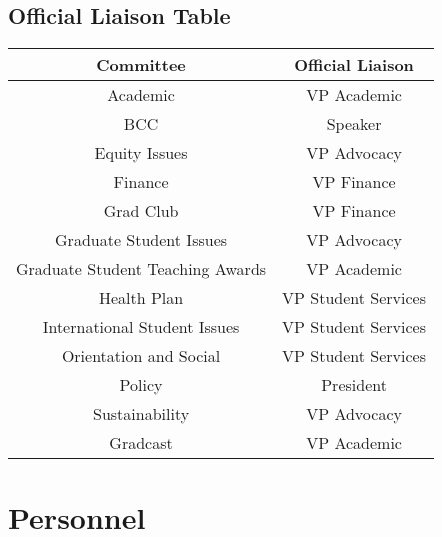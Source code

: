 \subsection{Official Liaison Table}
\begin{center}
    \begin{tabular}{  c | c }
\index{Committee!Official Liaison Table}
\index{Executive, The!Official Liaison Table}
    Committee & Official Liaison  \\ \hline 
    Academic & VP Academic \\ 
    BCC & Speaker \\ 
    Equity Issues & VP Advocacy \\ 
    Finance & VP Finance  \\ 
    Grad Club & VP Finance  \\ 
    Graduate Student Issues & VP Advocacy \\ 
    Graduate Student Teaching Awards & VP Academic \\ 
    Health Plan & VP Student Services \\ 
    International Student Issues &  VP Student Services \\ 
    Orientation and Social & VP Student Services \\  
    Policy & President \\ 
    Sustainability &VP Advocacy \\ 
    Gradcast & VP Academic \\ 

\end{tabular}
\end{center}

\newpage
{}

\section{Personnel}

